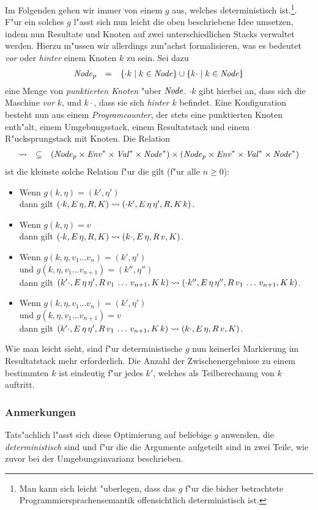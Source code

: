 \documentclass[12pt,a4paper]{article}
\begin{document}
Im Folgenden gehen wir immer von einem $g$ aus, welches deterministisch ist.\footnote{Man kann sich leicht
"uberlegen, dass das $g$ f"ur die bisher betrachtete Programmiersprachensemantik offensichtlich deterministisch
ist.}. F"ur ein solches $g$ l"asst sich nun leicht die oben beschriebene Idee umsetzen, indem nun Resultate und
Knoten auf zwei unterschiedlichen Stacks verwaltet werden. Hierzu m"ussen wir allerdings zun"achst formalisieren,
was es bedeutet \emph{vor} oder \emph{hinter} einem Knoten $k$ zu sein. Sei dazu
\[\begin{array}{rcl}
  \mathit{Node}_p &=& \{\cdot k \mid k \in \mathit{Node}\} \cup \{k \cdot \mid k \in \mathit{Node}\}
\end{array}\]
eine Menge von \emph{punktierten Knoten} "uber $\mathit{Node}$. $\cdot k$ gibt hierbei an, dass sich die Maschine
\emph{vor} $k$, und $k \cdot$, dass sie sich \emph{hinter} $k$ befindet. Eine Konfiguration besteht nun
aus einem \emph{Programcounter}, der stets eine punktierten Knoten enth"alt, einem Umgebungsstack,
einem Resultatstack und einem R"ucksprungstack mit Knoten. Die Relation
\[\begin{array}{rcl}
  \rightsquigarrow &\subseteq& (\mathit{Node}_p \times \mathit{Env}^* \times \mathit{Val}^* \times \mathit{Node}^*) \times (\mathit{Node}_p \times \mathit{Env}^* \times \mathit{Val}^* \times \mathit{Node}^*)
\end{array}\]
ist die kleinste solche Relation f"ur die gilt (f"ur alle $n \ge 0$):
\begin{itemize}
\item Wenn $g(k,\eta) = (k',\eta')$ \\
  dann gilt $(\cdot k,E\,\eta,R,K) \rightsquigarrow (\cdot k',E\,\eta\,\eta',R,K\,k)$.
\item Wenn $g(k,\eta) = v$ \\
  dann gilt $(\cdot k,E\,\eta,R,K) \rightsquigarrow (k\cdot,E\,\eta,R\,v,K)$.
\item Wenn $g(k,\eta,v_1 \ldots v_n) = (k',\eta')$ \\
  und $g(k,\eta,v_1 \ldots v_{n+1}) = (k'',\eta'')$ \\
  dann gilt $(k'\cdot,E\,\eta\,\eta',R\,v_1\,\ldots\,v_{n+1},K\,k) \rightsquigarrow (\cdot k'',E\,\eta\,\eta'',R\,v_1\,\ldots\,v_{n+1},K\,k)$.
\item Wenn $g(k,\eta,v_1 \ldots v_n) = (k',\eta')$ \\
  und $g(k,\eta,v_1 \ldots v_{n+1}) = v$ \\
  dann gilt $(k'\cdot,E\,\eta\,\eta',R\,v_1\,\ldots\,v_{n+1},K\,k) \rightsquigarrow (k\cdot,E\,\eta,R\,v,K)$.
\end{itemize}
Wie man leicht sieht, sind f"ur deterministische $g$ nun keinerlei Markierung im Resultatstack mehr erforderlich.
Die Anzahl der Zwischenergebnisse zu einem bestimmten $k$ ist eindeutig f"ur jedes $k'$, welches als Teilberechnung
von $k$ auftritt.


\subsubsection{Anmerkungen}

Tats"achlich l"asst sich diese Optimierung auf beliebige $g$ anwenden, die \emph{deterministisch} sind und f"ur
die die Argumente aufgeteilt sind in zwei Teile, wie zuvor bei der Umgebungsinvarianz beschrieben.
\end{document}
